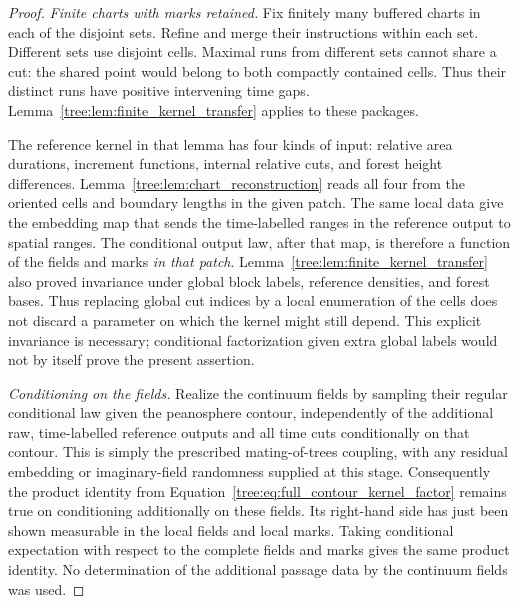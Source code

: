\begin{proof}
\emph{Finite charts with marks retained.}
Fix finitely many buffered charts in
each of the disjoint sets.  Refine and merge their instructions within
each set.  Different sets use disjoint cells.  Maximal runs from
different sets cannot share a cut: the shared point would belong to
both compactly contained cells.  Thus their distinct runs have
positive intervening time gaps.  Lemma~\ref{tree:lem:finite_kernel_transfer}
applies to these packages.

The reference kernel in that lemma has four kinds of input: relative
area durations, increment functions, internal relative cuts, and
forest height differences.  Lemma~\ref{tree:lem:chart_reconstruction}
reads all four from the oriented cells and boundary lengths in the
given patch.  The same local data give the embedding map that sends
the time-labelled ranges in the reference output to spatial ranges.
The conditional output law, after that map, is therefore a function
of the fields and marks \emph{in that patch}.  Lemma~\ref{tree:lem:finite_kernel_transfer}
also proved invariance under global block labels, reference densities,
and forest bases.  Thus replacing global cut indices by a local
enumeration of the cells does not discard a parameter on which the
kernel might still depend.  This explicit invariance is necessary;
conditional factorization given extra global labels would not by
itself prove the present assertion.

\emph{Conditioning on the fields.}
Realize the continuum fields by sampling their regular
conditional law given the peanosphere contour, independently of the
additional raw, time-labelled reference outputs and all time cuts
conditionally on that
contour.  This
is simply the prescribed mating-of-trees coupling, with any residual
embedding or imaginary-field randomness supplied at this stage.
Consequently the product identity from
Equation~\eqref{tree:eq:full_contour_kernel_factor} remains true on
conditioning additionally on these fields.  Its right-hand side
has just been shown measurable in the local fields and local marks.
Taking conditional expectation with respect to the complete fields
and marks gives the same product identity.  No determination of the
additional passage data by the continuum fields was used.


\end{proof}

